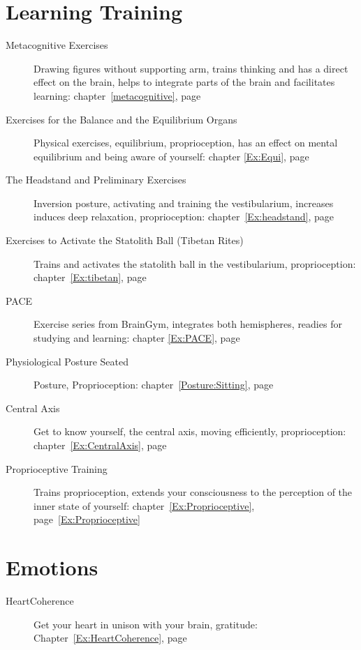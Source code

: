 \documentclass[../main.tex]{subfiles}
\begin{document}
\section{Learning Training}
\begin{description} 
\item[Metacognitive Exercises] Drawing figures without supporting arm, trains thinking and has a direct effect on the brain, helps to integrate parts of the brain and facilitates learning: chapter~\ref{metacognitive}, page~\pageref{metacognitive}
\item[Exercises for the Balance and the Equilibrium Organs] Physical exercises, equilibrium, proprioception, has an effect on mental equilibrium and being aware of yourself: chapter \ref{Ex:Equi}, page~\pageref{Ex:Equi}
\item[The Headstand and Preliminary Exercises] Inversion posture, activating and training the vestibularium, increases induces deep relaxation, proprioception: chapter~\ref{Ex:headstand}, page~\pageref{Ex:headstand}
\item[Exercises to Activate the Statolith Ball (Tibetan Rites)] Trains and activates the statolith ball in the vestibularium, proprioception:
  chapter~\ref{Ex:tibetan}, page~\pageref{Ex:tibetan}
\item[PACE] Exercise series from BrainGym, integrates both hemispheres, readies for studying and learning: chapter \ref{Ex:PACE}, page \pageref{Ex:PACE}
\item[Physiological Posture Seated] Posture, Proprioception: chapter~\ref{Posture:Sitting}, page~\pageref{Posture:Sitting}
\item[Central Axis] Get to know yourself, the central axis, moving efficiently, proprioception: chapter~\ref{Ex:CentralAxis}, page~\pageref{Ex:CentralAxis}
\item[Proprioceptive Training] Trains proprioception, extends your consciousness to the perception of the inner state of yourself: chapter~\ref{Ex:Proprioceptive}, page~\ref{Ex:Proprioceptive}
\end{description}

\section{Emotions}
\begin{description}
\item[HeartCoherence] Get your heart in unison with your brain, gratitude: Chapter~\ref{Ex:HeartCoherence}, page~\pageref{Ex:HeartCoherence}
\end{description}
\end{document}
